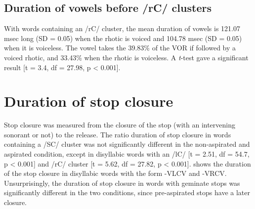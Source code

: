 \documentclass[11pt,a4paper,openany]{memoir}\usepackage[]{graphicx}\usepackage[]{color}
\begin{document}
\subsection{Duration of vowels before /rC/ clusters}



With words containing an /rC/ cluster, the mean duration of vowels is 121.07 msec long (SD = 0.05) when the rhotic is voiced and 104.78 msec (SD = 0.05) when it is voiceless.
The vowel takes the 39.83\% of the VOR if followed by a voiced rhotic, and 33.43\% when the rhotic is voiceless.
A \textit{t}-test gave a significant result [t = 3.4, df = 27.98, p < 0.001].

\section{Duration of stop closure}
\label{s:durstopclos}



Stop closure was measured from the closure of the stop (with an intervening sonorant or not) to the release.
The ratio duration of stop closure in words containing a /SC/ cluster was not significantly different in the non-aspirated and aspirated condition, except in disyllabic words with an /lC/ [t = 2.51, df = 54.7, p < 0.001] and /rC/ cluster [t = 5.62, df = 27.82, p < 0.001].
 shows the duration of the stop closure in disyllabic words with the form -VLCV and -VRCV.
Unsurprisingly, the duration of stop closure in words with geminate stops was significantly different in the two conditions, since pre-aspirated stops have a later closure.
\end{document}
